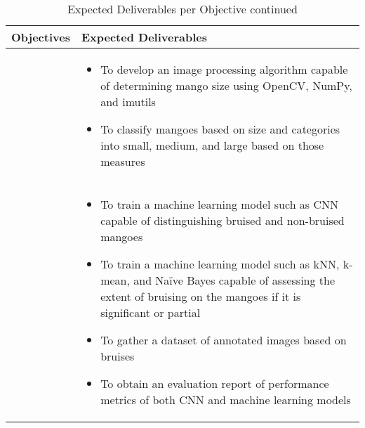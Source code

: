 \begin{table}[!htbp]
	\caption{Expected Deliverables per Objective continued} 	
	\label{tab:expd2} 
	{\centering \scriptsize
		\begin{tabular}{p{}|p{}}
			\hline 
			\hline 
			\textbf{Objectives} & 
			\textbf{Expected Deliverables}\\ 
			\hline 
			\Paste{SO6} & 
			\begin{minipage}{0.55\textwidth}
				\vspace{10pt}
				\begin{itemize}
					\item To develop an image processing algorithm capable of determining mango 
					size using OpenCV, NumPy, and imutils
					\item To classify mangoes based on size and categories into small, medium, 
					and large based on those measures
				\end{itemize}
			\end{minipage} \\ \hline
			
			\Paste{SO7} & 
			\begin{minipage}{0.55\textwidth}
				\vspace{10pt}
				\begin{itemize}
					\item To train a machine learning model such as 
					CNN capable of distinguishing bruised and non-bruised mangoes
					\item To train a machine learning model such as kNN, k-mean, and Naïve Bayes 
					capable of assessing the extent of bruising on the mangoes if it is significant or partial
					\item To gather a dataset of annotated images based on bruises
					\item To obtain an evaluation report of performance metrics of both CNN and machine learning models
				\end{itemize}
			\end{minipage} \\ \hline
		\end{tabular}
	}
\end{table}


